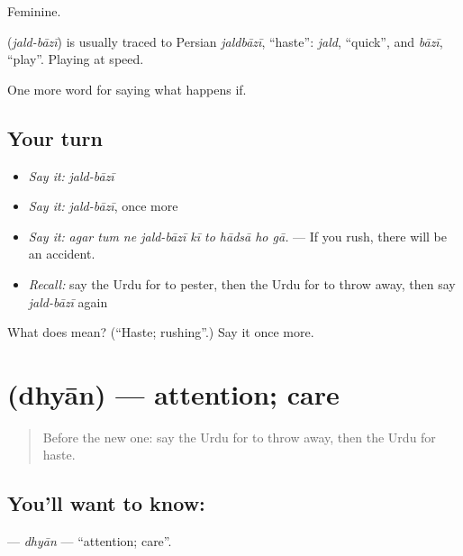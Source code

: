 Feminine.

\begin{cousinweb}
\textbf{ } (\emph{jald-bāzī}) is usually traced to Persian \emph{jaldbāzī}, \textquotedblleft{}haste\textquotedblright{}: \emph{jald}, \textquotedblleft{}quick\textquotedblright{}, and \emph{bāzī}, \textquotedblleft{}play\textquotedblright{}. Playing at speed.
\end{cousinweb}

\begin{grammarlens}[title={What you've built}]
One more word for saying what happens if.
\end{grammarlens}

\subsection*{Your turn}
\begin{itemize}
\raggedright
  \item \emph{Say it:} \emph{jald-bāzī}
  \item \emph{Say it:} \emph{jald-bāzī}, once more
  \item \emph{Say it:} \emph{agar tum ne jald-bāzī kī to hādsā ho gā.} — If you rush, there will be an accident.
  \item \emph{Recall:} say the Urdu for to pester, then the Urdu for to throw away, then say \emph{jald-bāzī} again
\end{itemize}

\begin{tcolorbox}[breakable,colback=teal!4,colframe=teal!35!black,title={Before you move on}]
What does   mean? (\textquotedblleft{}Haste; rushing\textquotedblright{}.) Say it once more.
\end{tcolorbox}
\section[\texorpdfstring{\ur{دھیان} (dhyān)}{دھیان (dhyān)}]{ (dhyān) — attention; care}

\label{lesson:UR-C370-dhyan}



\begin{quote}
Before the new one: say the Urdu for to throw away, then the Urdu for haste.
\end{quote}

\subsection*{You'll want to know: }
\textbf{} — \emph{dhyān} — \textquotedblleft{}attention; care\textquotedblright{}.

